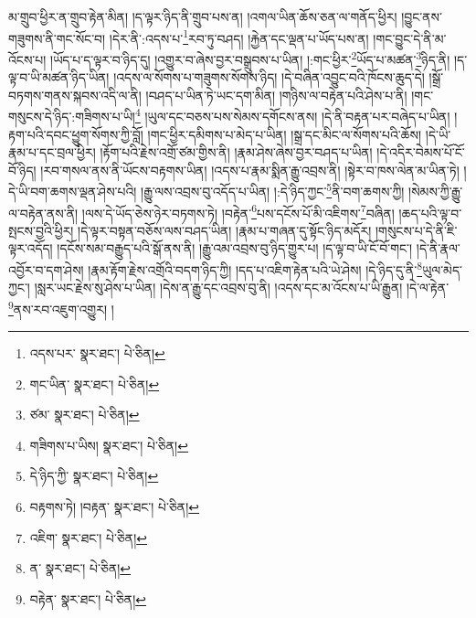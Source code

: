 མ་གྲུབ་ཕྱིར་ན་གྲུབ་རྟེན་མིན། །ད་ལྟར་ཉིད་ནི་གྲུབ་པས་ན། །འགལ་ཡིན་ཆོས་ཅན་ལ་གནོད་ཕྱིར། །བྱུང་ནས་གཟུགས་ནི་གང་སོང་བ། །དེར་ནི་:འདས་པ་\footnote{འདས་པར་  སྣར་ཐང་།  པེ་ཅིན། }རབ་ཏུ་བཤད། །རྐྱེན་དང་ལྡན་པ་ཡོད་པས་ན། །གང་བྱུང་དེ་ནི་མ་འོངས་པ། །ཡོད་པ་ད་ལྟར་བ་ཉིད་དུ། །འགྱུར་བ་ཞེས་བྱར་བསྒྲུབས་པ་ཡིན། །:གང་ཕྱིར་\footnote{གང་ཡིན་  སྣར་ཐང་།  པེ་ཅིན། }ཡོད་པ་མཚན་\footnote{ཙམ་  སྣར་ཐང་།  པེ་ཅིན། }ཉིད་ནི། །ད་ལྟ་བ་ཡི་མཚན་ཉིད་ཡིན། །འདས་ལ་སོགས་པ་གཟུགས་སོགས་ཉིད། །དེ་བཞིན་འབྱུང་བའི་ཁོངས་ཆུད་དེ། །སྒྲོ་བཏགས་གནས་སྐབས་འདི་ལ་ནི། །བཤད་པ་ཡིན་ཏེ་ཡང་དག་མིན། །གཉིས་ལ་བརྟེན་པའི་ཤེས་པ་ནི། །གང་གསུངས་དེ་ཉིད་:གཟིགས་པ་ཡི།\footnote{གཟིགས་པ་ཡིས།  སྣར་ཐང་།  པེ་ཅིན། } །ཡུལ་དང་བཅས་པས་སེམས་དགོངས་ནས། །དེ་ནི་བརྟན་པར་བཞེད་པ་ཡིན། །རྟག་པའི་དབང་ཕྱུག་སོགས་ཀྱི་བློ། །གང་ཕྱིར་དམིགས་པ་མེད་པ་ཡིན། །སྒྲ་དང་མིང་ལ་སོགས་པའི་ཆོས། །དེ་ཡི་རྣམ་པ་དང་བྲལ་ཕྱིར། །རྟོག་པའི་རྗེས་འགྲོ་ཙམ་གྱིས་ནི། །རྣམ་ཤེས་ཞེས་བྱར་བཤད་པ་ཡིན། །དེ་འདིར་བེམས་པོ་ངོ་བོ་ཉིད། །རབ་གསལ་ནས་ནི་ཡོངས་བརྟགས་ཡིན། །འདས་པ་རྣམ་སྨིན་རྒྱུ་འབྲས་ནི། །སྟེར་བ་ཁས་ལེན་མ་ཡིན་ཏེ། །དེ་ཡི་བག་ཆགས་ལྡན་ཤེས་པའི། །རྒྱུ་ལས་འབྲས་བུ་འདོད་པ་ཡིན། །:དེ་ཉིད་ཀྱང་\footnote{དེ་ཉིད་ཀྱི་  སྣར་ཐང་།  པེ་ཅིན། }ནི་བག་ཆགས་ཀྱི། །སེམས་ཀྱི་རྒྱུ་ལ་བརྟེན་ནས་ནི། །ལས་དེ་ཡོད་ཅེས་ཉེར་བཏགས་ཏེ། །བརྟེན་\footnote{བརྟགས་ཏེ། །བརྟན་  སྣར་ཐང་།  པེ་ཅིན། }པས་དངོས་པོ་མི་འཇིགས་\footnote{འཇིག་  སྣར་ཐང་།  པེ་ཅིན། }བཞིན། །ཆད་པའི་ལྟ་བ་སྤངས་བྱའི་ཕྱིར། །དེ་ལྟར་བསྟན་བཅོས་ལས་བཤད་ཡིན། །རྣམ་པ་གཞན་དུ་སྟོང་ཉིད་མདོར། །གསུངས་པ་དེ་ནི་ཇི་ལྟར་འདོད། །དངོས་སམ་བརྒྱུད་པའི་སྒོ་ནས་ནི། །རྒྱུ་འམ་འབྲས་བུ་ཉིད་གྱུར་པ། །ད་ལྟ་བ་ཡི་ངོ་བོ་གང་། །དེ་ནི་རྣལ་འབྱོར་བ་དག་ཤེས། །རྣམ་རྟོག་རྗེས་འགྲོའི་བདག་ཉིད་ཀྱི། །དད་པ་འཇིག་རྟེན་པའི་ཡེ་ཤེས། །དེ་ཉིད་དུ་ནི་\footnote{ན་  སྣར་ཐང་།  པེ་ཅིན། }ཡུལ་མེད་ཀྱང་། །སླར་ཡང་རྗེས་སུ་ཤེས་པ་ཡིན། །དེས་ན་རྒྱུ་དང་འབྲས་བུ་ནི། །འདས་དང་མ་འོངས་པ་ཡི་རྒྱུན། །དེ་ལ་རྟེན་\footnote{བརྟེན་  སྣར་ཐང་།  པེ་ཅིན། }ནས་རབ་འཇུག་འགྱུར། །
